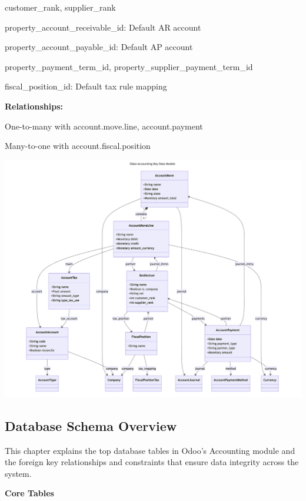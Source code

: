 \documentclass[11pt,a4paper]{article}
\begin{document}
\begin{enumerate}
    customer\_rank, supplier\_rank 

    property\_account\_receivable\_id: Default AR account 

    property\_account\_payable\_id: Default AP account 

    property\_payment\_term\_id, property\_supplier\_payment\_term\_id 

    fiscal\_position\_id: Default tax rule mapping 
    \medskip
    
    \textbf{Relationships:}

    One-to-many with account.move.line, account.payment

    Many-to-one with account.fiscal.position
\end{enumerate}

\begin{center}
    \includegraphics[width=0.8\linewidth]{diagram/odoo_accouting_key_data_models.png}
\end{center}

\subsection{Database Schema Overview}
This chapter explains the top database tables in Odoo's Accounting module and the foreign key relationships and constraints that ensure data integrity across the system.
\medskip

\noindent\textbf{Core Tables}
\medskip
\end{document}
